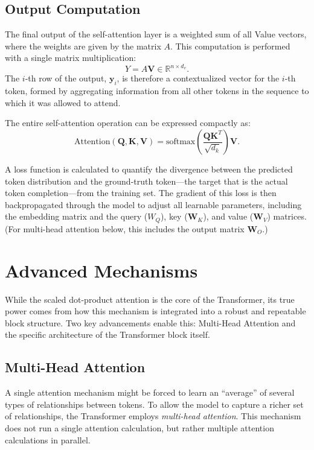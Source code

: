 \documentclass[%
  reprint,
  superscriptaddress,
  showpacs,
  showkeys,
  amsmath,amssymb,
  pra,
  longbibliography,
  floatfix,
  x11names
]{revtex4-2}
\begin{document}
\subsection{Output Computation}

The final output of the self-attention layer is a weighted sum of all Value vectors, where the weights are given by the matrix $A$. This computation is performed with a single matrix multiplication:
\begin{equation}
    Y = A \bm{V} \in \mathbb{R}^{n \times d_v}.
\label{2025-llm-e:Y}
\end{equation}
The $i$-th row of the output, $\bm{y}_i$, is therefore a contextualized vector for the $i$-th token,
formed by aggregating information from all other tokens in the sequence to which it was allowed to attend.

The entire self-attention operation can be expressed compactly as:
\begin{equation}
    \text{Attention}(\bm{Q}, \bm{K}, \bm{V}) = \text{softmax}\left(\frac{\bm{Q} \bm{K}^T}{\sqrt{d_k}}\right) \bm{V}.
\end{equation}



A loss function is calculated to quantify the divergence between the predicted token distribution and
the ground-truth token---the target that is the actual token completion---from the training set.
The gradient of this loss is then backpropagated through the model to adjust all learnable parameters,
including the embedding matrix and the query ($W_Q$), key ($\bm{W}_K$), and value ($\bm{W}_V$) matrices.
(For multi-head attention below, this includes the output matrix $\bm{W}_O$.)

\section{Advanced Mechanisms}

While the scaled dot-product attention is the core of the Transformer, its true power comes from how this mechanism is integrated into a robust and repeatable block structure. Two key advancements enable this: Multi-Head Attention and the specific architecture of the Transformer block itself.

\subsection{Multi-Head Attention}
\label{2025-llm-mha}
A single attention mechanism might be forced to learn an ``average'' of several types of relationships between tokens.
 To allow the model to capture a richer set of relationships, the Transformer employs \textit{multi-head attention}.
This mechanism does not run a single attention calculation, but rather multiple attention calculations in parallel.
\end{document}
